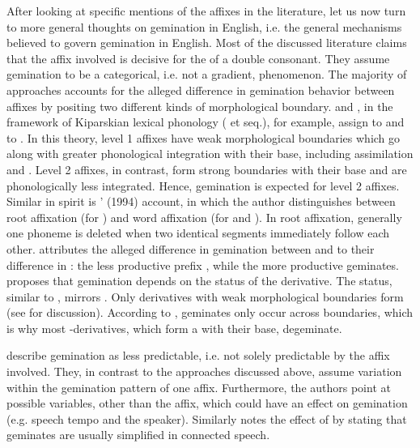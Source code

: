 After looking at specific mentions of the affixes in the literature, let us now turn to more general thoughts on gemination in English, i.e. the general mechanisms believed to govern gemination in English. 
Most of the discussed literature claims that the affix involved is decisive for the  of a double consonant. They assume gemination to be a categorical, i.e. not a gradient, phenomenon. The majority of approaches accounts for the alleged difference in gemination behavior between affixes by positing two different kinds of morphological boundary. \citet[18]{Mohanan.1986} and \citet[119 ff.]{Borowsky.1986}, in the framework of Kiparskian lexical phonology (\citealt{Kiparsky.1982} et seq.), for example, assign  to  and  to . In this theory, {level 1} affixes have weak morphological boundaries  which go along with greater phonological integration with their base, including assimilation and . Level 2 affixes, in contrast, form strong boundaries with their base and are phonologically less integrated. Hence, gemination is expected for {level 2} affixes. Similar in spirit is \citeauthor{Harris.1994}' (1994) account, in which the author distinguishes between root {affixation} (for ) and word {affixation} (for  and ). In root {affixation}, generally one phoneme is deleted when two identical segments immediately follow each other. 
\cite{CohenGoldberg.2013} attributes the alleged difference in gemination between  and  to their difference in  : the less productive prefix  , while the more productive  geminates. 
\citet[354]{Giegerich.2012} proposes that gemination depends on the  status of the derivative. The  status, similar to , mirrors . Only derivatives with weak morphological boundaries form  (see  for discussion). According to \cite{Giegerich.2012}, geminates only occur across  boundaries, which is why most -derivatives, which form a  with their base, {degeminate}.

\citet[169]{Bauer.2013} describe gemination as less predictable, i.e.  not solely  predictable by the affix involved. They, in contrast to the approaches discussed above, assume variation within the gemination pattern of one affix. Furthermore, the authors point at possible variables, other than the affix, which could have an effect on gemination (e.g. speech tempo and the speaker). Similarly \citet[191, 288]{Giegerich.1992} notes the effect of  by stating that geminates are usually simplified in connected speech.
 

